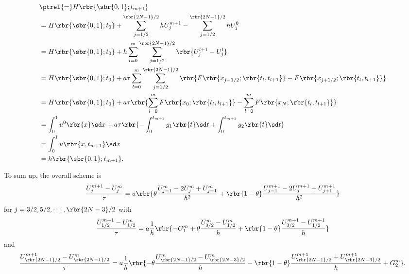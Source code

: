 \documentclass[english, nochinese]{pnote}
\begin{document}
\begin{equation}
\begin{split}
&\ptrel{=} H \rbr{ \sbr{ 0, 1 }; t_{ m + 1 } } \\
&= H \rbr{ \sbr{ 0, 1 }; t_0 } + \sum_{ j = 1 / 2 }^{ \rbr{ 2 N - 1 } / 2 } h U_j^{ m + 1 } - \sum_{ j = 1 / 2 }^{ \rbr{ 2 N - 1 } / 2 } h U_j^0 \\
&= H \rbr{ \sbr{ 0, 1 }; t_0 } + h \sum_{ l = 0 }^m \sum_{ j = 1 / 2 }^{ \rbr{ 2 N - 1 } / 2 } \rbr{ U_j^{ l + 1 } - U_j^l } \\
&= H \rbr{ \sbr{ 0, 1 }; t_0 } + a \tau \sum_{ l = 0 }^m \sum_{ j = 1 / 2 }^{ \rbr{ 2 N - 1 } / 2 } \rbr{ F \rbr{ x_{ j - 1 / 2 }; \rbr{ t_l, t_{ l + 1 } } } - F \rbr{ x_{ j + 1 / 2 }; \rbr{ t_l, t_{ l + 1 } } } } \\
&= H \rbr{ \sbr{ 0, 1 }; t_0 } + a \tau \rbr{ \sum_{ l = 0 }^m F \rbr{ x_0; \rbr{ t_l, t_{ l + 1 } } } - \sum_{ l = 0 }^m F \rbr{ x_N; \rbr{ t_l, t_{ l + 1 } } } } \\
&= \int_0^1 u^0 \rbr{x} \sd x + a \tau \rbr{ -\int_0^{t_{ m + 1 }} g_1 \rbr{t} \sd t + \int_0^{t_{ m + 1 }} g_2 \rbr{t} \sd t } \\
&= \int_0^1 u \rbr{ x, t_{ m + 1 } } \sd x \\
&= h \rbr{ \sbr{ 0, 1 }; t_{ m + 1 } }.
\end{split}
\end{equation}

To sum up, the overall scheme is
\begin{equation}
\frac{ U_j^{ m + 1 } - U_j^m }{\tau} = a \rbr{ \theta \frac{ U_{ j - 1 }^m - 2 U_j^m + U_{ j + 1 }^m }{h^2} + \rbr{ 1 - \theta } \frac{ U_{ j - 1 }^{ m + 1 } - 2 U_j^{ m + 1 } + U_{ j + 1 }^{ m + 1 } }{h^2} }
\end{equation}
for $ j = 3 / 2, 5 / 2, \cdots, \rbr{ 2 N - 3 } / 2 $ with
\begin{equation}
\frac{ U_{ 1 / 2 }^{ m + 1 } - U_{ 1 / 2 }^m }{\tau} = a \frac{1}{h} \rbr{ -G_1^m + \theta \frac{ U_{ 3 / 2 }^m - U_{ 1 / 2 }^m }{h} + \rbr{ 1 - \theta } \frac{ U_{ 3 / 2 }^{ m + 1 } - U_{ 1 / 2 }^{ m + 1 } }{h} }
\end{equation}
and
\begin{equation}
\frac{ U_{ \rbr{ 2 N - 1 } / 2 }^{ m + 1 } - U_{ \rbr{ 2 N - 1 } / 2 }^m }{\tau} = a \frac{1}{h} \rbr{ -\theta \frac{ U_{ \rbr{ 2 N - 1 } / 2 }^m - U_{ \rbr{ 2 N - 3 } / 2 }^m }{h} - \rbr{ 1 - \theta } \frac{ U_{ \rbr{ 2 N - 1 } / 2 }^{ m + 1 } + U_{\rbr{ 2 N - 3 } / 2 }^{ m + 1 } }{h} + G_2^m  }.
\end{equation}
\end{document}
